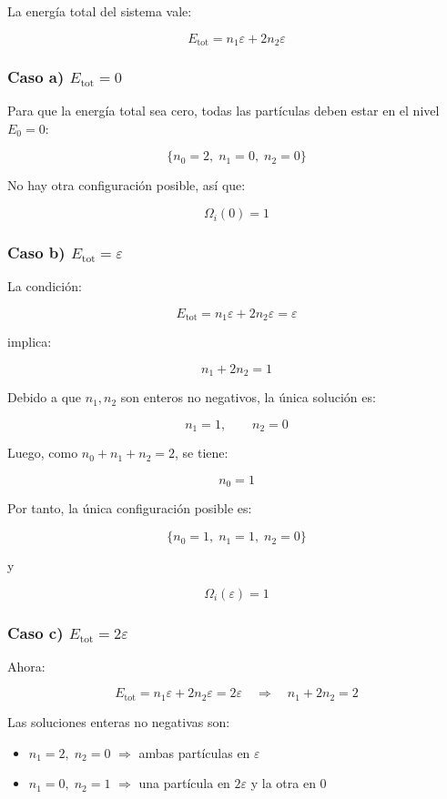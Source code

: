 \documentclass{article}
\begin{document}
La energía total del sistema vale:

\[
E_{\mathrm{tot}} = n_{1}\varepsilon + 2n_{2}\varepsilon
\]

\subsubsection*{Caso a) \(E_{\mathrm{tot}}=0\)}

Para que la energía total sea cero, todas las partículas deben estar en el
nivel \(E_{0}=0\):

\[
\{n_{0}=2,\;n_{1}=0,\;n_{2}=0\}
\]

No hay otra configuración posible, así que:

\[
\boxed{\Omega_{i}(0) = 1}
\]

\subsubsection*{Caso b) \(E_{\mathrm{tot}}=\varepsilon\)}

La condición:

\[
E_{\mathrm{tot}} = n_{1}\varepsilon + 2n_{2}\varepsilon = \varepsilon
\]

implica:

\[
n_{1} + 2n_{2} = 1
\]

Debido a que \(n_{1},n_{2}\) son enteros no negativos, la única solución es:

\[
n_{1}=1,\qquad n_{2}=0
\]

Luego, como \(n_{0}+n_{1}+n_{2}=2\), se tiene:

\[
n_{0} = 1
\]

Por tanto, la única configuración posible es:

\[
\{n_{0}=1,\;n_{1}=1,\;n_{2}=0\}
\]

y

\[
\boxed{\Omega_{i}(\varepsilon) = 1}
\]

\subsubsection*{Caso c) \(E_{\mathrm{tot}}=2\varepsilon\)}

Ahora:

\[
E_{\mathrm{tot}} = n_{1}\varepsilon + 2n_{2}\varepsilon = 2\varepsilon
\quad\Rightarrow\quad
n_{1} + 2n_{2} = 2
\]

Las soluciones enteras no negativas son:

\begin{itemize}
  \item \(n_{1}=2,\;n_{2}=0\)  \(\Rightarrow\) ambas partículas en \(\varepsilon\)
  \item \(n_{1}=0,\;n_{2}=1\)  \(\Rightarrow\) una partícula en \(2\varepsilon\) y la otra en \(0\)
\end{itemize}
\end{document}

